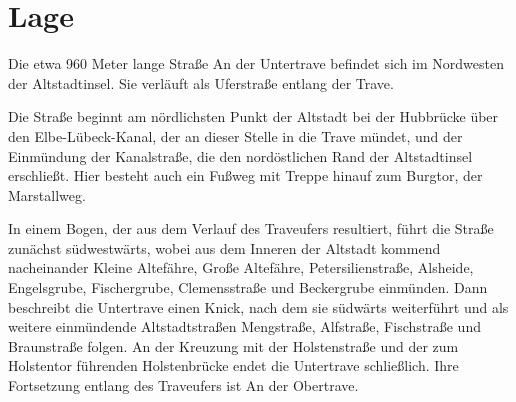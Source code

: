 
\chapter{Lage}
\label{chapter-lage}

Die etwa 960 Meter lange Straße An der Untertrave befindet sich im Nordwesten der Altstadtinsel. Sie verläuft als Uferstraße entlang der Trave.

Die Straße beginnt am nördlichsten Punkt der Altstadt bei der Hubbrücke über den Elbe-Lübeck-Kanal, der an dieser Stelle in die Trave mündet, und der Einmündung der Kanalstraße, die den nordöstlichen Rand der Altstadtinsel erschließt. Hier besteht auch ein Fußweg mit Treppe hinauf zum Burgtor, der Marstallweg.

In einem Bogen, der aus dem Verlauf des Traveufers resultiert, führt die Straße zunächst südwestwärts, wobei aus dem Inneren der Altstadt kommend nacheinander Kleine Altefähre, Große Altefähre, Petersilienstraße, Alsheide, Engelsgrube, Fischergrube, Clemensstraße und Beckergrube einmünden. Dann beschreibt die Untertrave einen Knick, nach dem sie südwärts weiterführt und als weitere einmündende Altstadtstraßen Mengstraße, Alfstraße, Fischstraße und Braunstraße folgen. An der Kreuzung mit der Holstenstraße und der zum Holstentor führenden Holstenbrücke endet die Untertrave schließlich. Ihre Fortsetzung entlang des Traveufers ist An der Obertrave.


